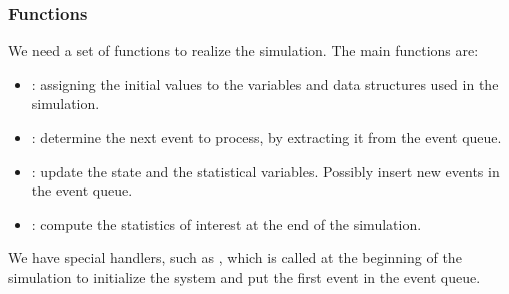\subsubsection{Functions}
We need a set of functions to realize the simulation. The main functions are:
\begin{itemize}
\item {}: assigning the initial values to the variables and data structures used in the simulation.
\item {}: determine the next event to process, by extracting it from the event queue.
\item {}: update the state and the statistical variables. Possibly insert new events in the event queue.
\item {}: compute the statistics of interest at the end of the simulation.
\end{itemize}

We have special handlers, such as , which is called at the beginning of the simulation to initialize the system and put the first event in the event queue.
